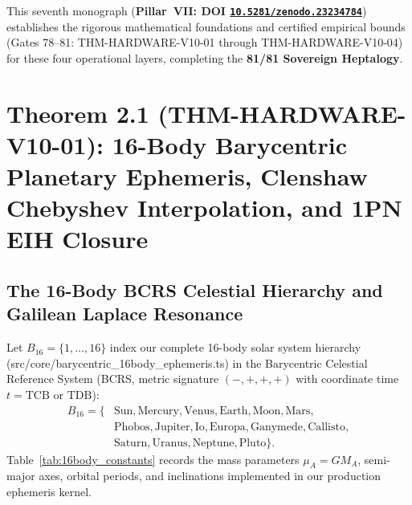 \documentclass[11pt,a4paper,reqno]{article}
\def\texttt#1{#1}%
\def\mathcal#1{#1}%
\newcommand{\zenodo}[1]{\href{https://doi.org/10.5281/zenodo.#1}{\nolinkurl{10.5281/zenodo.#1}}}
\theoremstyle{plain}
\theoremstyle{definition}
\theoremstyle{remark}
\numberwithin{equation}{section}
\begin{document}
This seventh monograph (\textbf{Pillar~VII: DOI \zenodo{23234784}}) establishes the rigorous mathematical foundations and certified empirical bounds (\texttt{Gates 78--81}: \texttt{THM-HARDWARE-V10-01} through \texttt{THM-HARDWARE-V10-04}) for these four operational layers, completing the \textbf{81/81 Sovereign Heptalogy}.

\section{\texorpdfstring{Theorem 2.1 (\texttt{THM-HARDWARE-V10-01}): 16-Body Barycentric Planetary Ephemeris, Clenshaw Chebyshev Interpolation, and 1PN EIH Closure}{Theorem 2.1 (THM-HARDWARE-V10-01): 16-Body Barycentric Planetary Ephemeris, Clenshaw Chebyshev Interpolation, and 1PN EIH Closure}}

\subsection{The 16-Body BCRS Celestial Hierarchy and Galilean Laplace Resonance}
Let $\mathcal{B}_{16} = \{1, \dots, 16\}$ index our complete 16-body solar system hierarchy (\texttt{src/core/barycentric\_16body\_ephemeris.ts}) in the Barycentric Celestial Reference System (BCRS, metric signature $(-,+,+,+)$ with coordinate time $t = \text{TCB}$ or $\text{TDB}$):
\begin{equation}
  \begin{aligned}
    \mathcal{B}_{16} = \big\{&\text{Sun}, \text{Mercury}, \text{Venus}, \text{Earth}, \text{Moon}, \text{Mars},\\
    &\text{Phobos}, \text{Jupiter}, \text{Io}, \text{Europa}, \text{Ganymede}, \text{Callisto},\\
    &\text{Saturn}, \text{Uranus}, \text{Neptune}, \text{Pluto}\big\}.
  \end{aligned}
  \label{eq:16body_set}
\end{equation}
Table~\ref{tab:16body_constants} records the mass parameters $\mu_A = GM_A$, semi-major axes, orbital periods, and inclinations implemented in our production ephemeris kernel.
\end{document}
